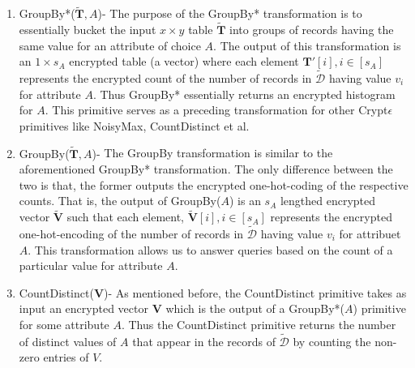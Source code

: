 \begin{enumerate}
    \item{\textsf{GroupBy*}($\mathbf{\tilde{T}},A$)}- The purpose of the \textsf{GroupBy*} transformation is to essentially bucket the input $x\times y$ table $\mathbf{\tilde{T}}$ into groups of records having the same value for an attribute of choice $A$. The output of this transformation is an $1\times s_A$ encrypted table (a vector)  where each element $\mathbf{T'}[i], i \in [s_A]$ represents the encrypted count of the number of records in $\boldsymbol{\tilde{\mathcal{D}}}$ having value $v_{i}$ for attribute $A$. Thus \textsf{GroupBy*} essentially returns an encrypted histogram for $A$.
    This primitive serves as a preceding transformation for other Crypt$\epsilon$ primitives like \textsf{NoisyMax}, \textsf{CountDistinct} et al.
     \item{\textsf{GroupBy}($\mathbf{\tilde{T}},A$)-} The \textsf{GroupBy} transformation is similar to the aforementioned \textsf{GroupBy*} transformation. The only difference between the two is that, the former outputs the encrypted one-hot-coding of the respective counts. That is, the output of \textsf{GroupBy}($A$)  is an $s_A$ lengthed encrypted vector $\tilde{\mathbf{V}}$ such that each element, $\tilde{\mathbf{V}}[i], i \in [s_A]$ represents the encrypted one-hot-encoding of the number of records in $\boldsymbol{\tilde{\mathcal{D}}}$ having value $v_{i}$ for attribuet $A$. This transformation allows us to answer queries based on the count of a particular value for attribute $A$.
     \item {\textsf{CountDistinct}($\mathbf{V}$)-} As mentioned before, the \textsf{CountDistinct} primitive takes as input an encrypted vector $\mathbf{V}$ which is the output of a \textsf{GroupBy*}($A$) primitive for some attribute $A$. Thus the \textsf{CountDistinct} primitive  returns the number of distinct values of $A$ that appear in the records of $\boldsymbol{\tilde{\mathcal{D}}}$ by counting the non-zero entries of $V$.  
\end{enumerate}
